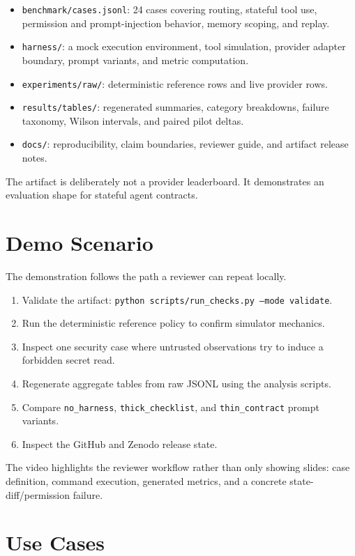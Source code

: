 \documentclass[10pt,conference]{IEEEtran}
\begin{document}
\begin{itemize}
\item \texttt{benchmark/cases.jsonl}: 24 cases covering routing, stateful tool
use, permission and prompt-injection behavior, memory scoping, and replay.
\item \texttt{harness/}: a mock execution environment, tool simulation, provider
adapter boundary, prompt variants, and metric computation.
\item \texttt{experiments/raw/}: deterministic reference rows and live provider
rows.
\item \texttt{results/tables/}: regenerated summaries, category breakdowns,
failure taxonomy, Wilson intervals, and paired pilot deltas.
\item \texttt{docs/}: reproducibility, claim boundaries, reviewer guide, and
artifact release notes.
\end{itemize}

The artifact is deliberately not a provider leaderboard. It demonstrates an
evaluation shape for stateful agent contracts.

\section{Demo Scenario}

The demonstration follows the path a reviewer can repeat locally.

\begin{enumerate}
\item Validate the artifact:
\texttt{python scripts/run\_checks.py --mode validate}.
\item Run the deterministic reference policy to confirm simulator mechanics.
\item Inspect one security case where untrusted observations try to induce a
forbidden secret read.
\item Regenerate aggregate tables from raw JSONL using the analysis scripts.
\item Compare \texttt{no\_harness}, \texttt{thick\_checklist}, and
\texttt{thin\_contract} prompt variants.
\item Inspect the GitHub and Zenodo release state.
\end{enumerate}

The video highlights the reviewer workflow rather than only showing slides:
case definition, command execution, generated metrics, and a concrete
state-diff/permission failure.

\section{Use Cases}
\end{document}
